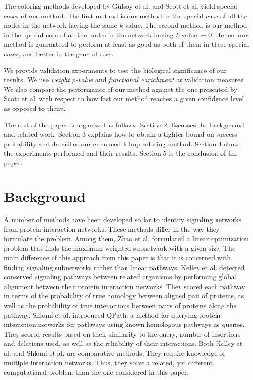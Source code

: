 \documentclass{ws-procs11x85}
\begin{document}
The coloring methods developed by G{\"u}lsoy et al.\cite{gulsoy} and Scott et
al.\cite{scott} yield special cases of our method. The first method is our
method in the special case of all the nodes in the network having the same $k$
value. The second method is our method in the special case of all the nodes in
the network having $k$ value $= 0$. Hence, our method is guaranteed to perform
at least as good as both of them in these special cases, and better in the
general case.

We provide validation experiments to test the biological significance of our
results. We use \textit{weight p-value} and \textit{functional enrichment} as
validation measures. We also compare the performance of our method against the
one presented by Scott et al.\cite{scott} with respect to how fast our method
reaches a given confidence level as opposed to theirs.

The rest of the paper is organized as follows. Section 2 discusses the
background and related work. Section 3 explains how to obtain a tighter bound on
success probability and describes our enhanced k-hop coloring method. Section 4
shows the experiments performed and their results. Section 5 is the conclusion
of the paper.


\section{Background}
\label{background}

A number of methods have been developed so far to identify signaling networks
from protein interaction networks. These methods differ in the way they
formulate the problem. Among them, Zhao et al.\cite{zhao} formulated a linear
optimization problem that finds the maximum weighted subnetwork with a given
size. The main difference of this approach from this paper is that it is
concerned with finding signaling subnetworks rather than linear pathways.
Kelley et al.\cite{kelley} detected conserved signaling pathways between
related organisms by performing global alignment between their protein
interaction networks. They scored each pathway in terms of the probability of
true homology between aligned pair of proteins, as well as the probability of
true interactions between pairs of proteins along the pathway. Shlomi et
al.\cite{shlomi} introduced QPath, a method for querying protein interaction
networks for pathways using known homologous pathways as queries. They scored
results based on their similarity to the query, number of insertions and
deletions used, as well as the reliability of their interactions. Both Kelley
et al.\cite{kelley} and Shlomi et al.\cite{shlomi} are comparative methods.
They require knowledge of multiple interaction networks. Thus, they solve a
related, yet different, computational problem than the one considered in this
paper.
\end{document}
